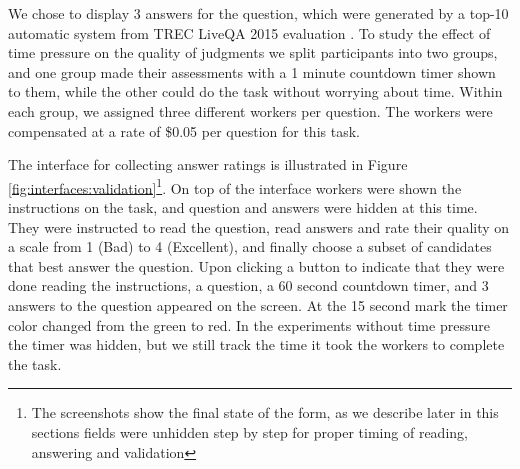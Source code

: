 \documentclass[11pt,letterpaper]{article}
\begin{document}
We chose to display 3 answers for the question, which were generated by a top-10 automatic system from TREC LiveQA 2015 evaluation \cite{overviewliveqa15}.
To study the effect of time pressure on the quality of judgments we split participants into two groups, and one group made their assessments with a 1 minute countdown timer shown to them, while the other could do the task without worrying about time.
Within each group, we assigned three different workers per question.
The workers were compensated at a rate of \$0.05 per question for this task.

The interface for collecting answer ratings is illustrated in Figure \ref{fig:interfaces:validation}\footnote{The screenshots show the final state of the form, as we describe later in this sections fields were unhidden step by step for proper timing of reading, answering and validation}.
On top of the interface workers were shown the instructions on the task, and question and answers were hidden at this time.
They were instructed to read the question, read answers and rate their quality on a scale from 1 (Bad) to 4 (Excellent), and finally choose a subset of candidates that best answer the question.
Upon clicking a button to indicate that they were done reading the instructions, a question, a 60 second countdown timer, and 3 answers to the question appeared on the screen.
At the 15 second mark the timer color changed from the green to red.
In the experiments without time pressure the timer was hidden, but we still track the time it took the workers to complete the task.
\end{document}
